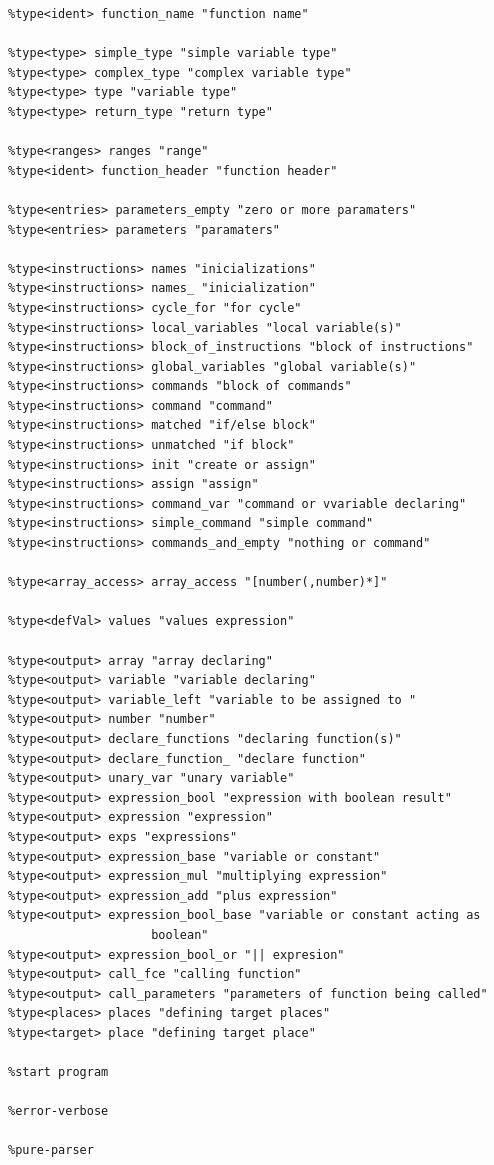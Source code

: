 \documentclass[12pt,notitlepage]{report}
\begin{document}
\begin{verbatim}
%type<ident> function_name "function name"

%type<type> simple_type "simple variable type"
%type<type> complex_type "complex variable type"
%type<type> type "variable type"
%type<type> return_type "return type"

%type<ranges> ranges "range"
%type<ident> function_header "function header"

%type<entries> parameters_empty "zero or more paramaters"
%type<entries> parameters "paramaters"

%type<instructions> names "inicializations"
%type<instructions> names_ "inicialization"
%type<instructions> cycle_for "for cycle"
%type<instructions> local_variables "local variable(s)"
%type<instructions> block_of_instructions "block of instructions"
%type<instructions> global_variables "global variable(s)"
%type<instructions> commands "block of commands"
%type<instructions> command "command"
%type<instructions> matched "if/else block"
%type<instructions> unmatched "if block"
%type<instructions> init "create or assign"
%type<instructions> assign "assign"
%type<instructions> command_var "command or vvariable declaring"
%type<instructions> simple_command "simple command"
%type<instructions> commands_and_empty "nothing or command"

%type<array_access> array_access "[number(,number)*]"

%type<defVal> values "values expression"

%type<output> array "array declaring"
%type<output> variable "variable declaring"
%type<output> variable_left "variable to be assigned to "
%type<output> number "number"
%type<output> declare_functions "declaring function(s)"
%type<output> declare_function_ "declare function"
%type<output> unary_var "unary variable"
%type<output> expression_bool "expression with boolean result"
%type<output> expression "expression"
%type<output> exps "expressions"
%type<output> expression_base "variable or constant"
%type<output> expression_mul "multiplying expression"
%type<output> expression_add "plus expression"
%type<output> expression_bool_base "variable or constant acting as 
					boolean"
%type<output> expression_bool_or "|| expresion"
%type<output> call_fce "calling function"
%type<output> call_parameters "parameters of function being called"
%type<places> places "defining target places"
%type<target> place "defining target place"

%start program

%error-verbose

%pure-parser


\end{verbatim}
\end{document}
